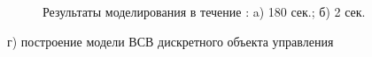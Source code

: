 \documentclass[a4paper,14pt]{extreport}
\begin{document}
\begin{figure}[H]
\begin{minipage}[h]{0.49\linewidth}
\end{minipage}
\hfill
\begin{minipage}[h]{0.49\linewidth}
\end{minipage}
\caption{Результаты моделирования в течение : a) 180 сек.; б) 2 сек.}
\label{ris:image1}\end{figure}

г) построение модели ВСВ дискретного объекта управления
\end{document}
